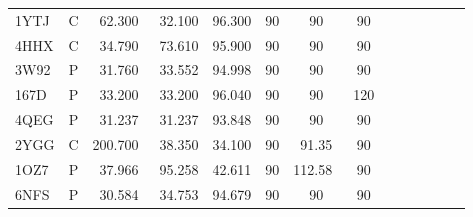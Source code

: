 \documentclass[preprint]{iucr}              %
\numberwithin{equation}{section}
\numberwithin{equation}{section}
\begin{document}
\begin{table}
\begin{center}
\begin{tabular}{lcccccccclcccc}
				1YTJ  & C  & 62.300  & 32.100  & 96.300   & 90     & 90      & 90   \\
				4HHX  & C  & 34.790  & 73.610  & 95.900   & 90     & 90      & 90   \\
				3W92  & P  & 31.760  & 33.552  & 94.998   & 90     & 90      & 90   \\
				167D  & P  & 33.200  & 33.200  & 96.040   & 90     & 90      & 120  \\
				4QEG  & P  & 31.237  & 31.237  & 93.848   & 90     & 90      & 90   \\
				2YGG  & C  & 200.700~ & 38.350  & 34.100   & 90     & 91.35   & 90   \\
				1OZ7  & P  & 37.966  & 95.258  & 42.611   & 90     & 112.58~  & 90   \\
				6NFS  & P  & 30.584  & 34.753  & 94.679   & 90     & 90      & 90   \\ \bottomrule
			\end{tabular}			
			\label{table:PDB1}
		\end{center}
	\end{table}
	
\end{document}
